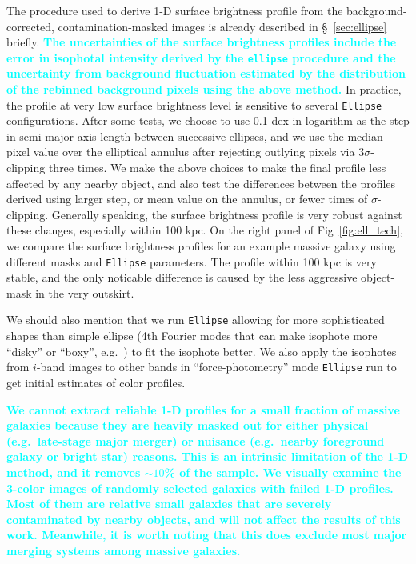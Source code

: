 \documentclass[a4paper,fleqn,usenatbib]{mnras}
\newcommand{\song}[1]{\textcolor{cyan}{\textbf{#1}}}
\begin{document}
    The procedure used to derive 1-D surface brightness profile from the 
    background-corrected, contamination-masked images is already described in 
    \S~\ref{sec:ellipse} briefly. 
    \song{
    The uncertainties of the surface brightness profiles include the error in 
    isophotal intensity derived by the \texttt{ellipse} procedure and the 
    uncertainty from background fluctuation estimated by the distribution of the 
    rebinned background pixels using the above method. 
    }
    In practice, the profile at very low surface brightness level is sensitive to 
    several \texttt{Ellipse} configurations.
    After some tests, we choose to use 0.1 dex in logarithm as the step in semi-major 
    axis length between successive ellipses, and we use the median pixel value over the
    elliptical annulus after rejecting outlying pixels via $3\sigma$-clipping three
    times.
    We make the above choices to make the final profile less affected by any nearby
    object, and also test the differences between the profiles derived using larger
    step, or mean value on the annulus, or fewer times of $\sigma$-clipping. 
    Generally speaking, the surface brightness profile is very robust against these
    changes, especially within 100 kpc. 
    On the right panel of Fig~\ref{fig:ell_tech}, we compare the surface brightness
    profiles for an example massive galaxy using different masks and \texttt{Ellipse}
    parameters. 
    The profile within 100 kpc is very stable, and the only noticable difference 
    is caused by the less aggressive object-mask in the very outskirt.    
    
    We should also mention that we run \texttt{Ellipse} allowing for more 
    sophisticated shapes than simple ellipse (4th Fourier modes that can make 
    isophote more ``disky'' or ``boxy'', e.g.\ \citealt{Kormendy2009}) to fit the 
    isophote better.
    We also apply the isophotes from $i$-band images to other bands in 
    ``force-photometry'' mode \texttt{Ellipse} run to get initial estimates of 
    color profiles.  
    
    \song{
    We cannot extract reliable 1-D profiles for a small fraction of massive galaxies 
    because they are heavily masked out for either physical 
    (e.g.\ late-stage major merger) or nuisance (e.g.\ nearby foreground 
    galaxy or bright star) reasons. 
    This is an intrinsic limitation of the 1-D method, and it removes ${\sim}10$\% of 
    the sample.
    We visually examine the 3-color images of randomly selected galaxies with failed 
    1-D profiles.  
    Most of them are relative small galaxies that are severely contaminated by nearby 
    objects, and will not affect the results of this work.  
    Meanwhile, it is worth noting that this does exclude most major merging systems 
    among massive galaxies. 
    }
\end{document}
